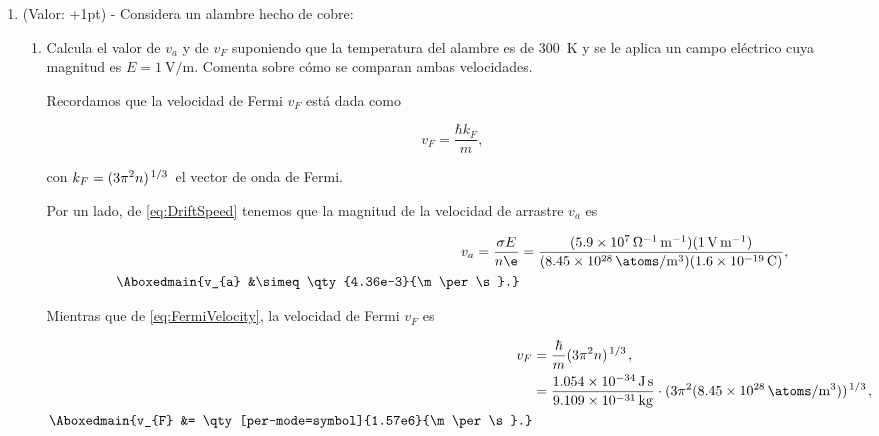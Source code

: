 \documentclass[./../main.tex]{subfiles}
\begin{document}
\begin{exercise}
\begin{enumerate}
            \color{blue}
            \item (Valor: +1pt) - Considera un alambre hecho de cobre:
                \begin{enumerate}[label = (b.\arabic*)]
                    \item Calcula el valor de \(v_{a}\) y de \(v_{F}\) suponiendo que la temperatura del alambre es de \qty{300}{\kelvin} y se le aplica un campo eléctrico cuya magnitud es \(E = \qty{1}{\V\per\m}\). Comenta sobre cómo se comparan ambas velocidades.
                    
                    \color{black}
                    \begin{solution}
                        Recordamos que la velocidad de Fermi \(v_{F}\) está dada como

                        \begin{equation}
                            v_{F} = \dfrac{\hbar k_{F}}{m},
                            \label{eq:FermiVelocity}
                        \end{equation}

                        con \(k_{F} = (3\pi^{2}n)^{\slashfrac{1}{3}}\) el vector de onda de Fermi.

                        Por un lado, de \cref{eq:DriftSpeed} tenemos que la magnitud de la velocidad de arrastre \(v_{a}\) es

                        \begin{align*}
                            v_{a} = \dfrac{\sigma E}{n\e} &= \dfrac{(\qty[per-mode=power]{5.9e7}{\per\ohm\per\m})(\qty{1}{\V\per\m})}{(\qty[per-mode=symbol]{8.45e28}{\atoms\per\m\cubed})(\qty{1.6e-19}{\C})},\\
                            \Aboxedmain{v_{a} &\simeq \qty{4.36e-3}{\m\per\s}.}
                        \end{align*}

                        Mientras que de \cref{eq:FermiVelocity}, la velocidad de Fermi \(v_{F}\) es

                        \begin{align}
                            v_{F} &= \dfrac{\hbar}{m}(3\pi^{2}n)^{\slashfrac{1}{3}},\label{eq:FermiVelocityComplete}\\
                            &= \dfrac{\qty{1.054e-34}{\J\s}}{\qty{9.109e-31}{\kg}}\cdot (3\pi^{2}(\qty[per-mode=symbol]{8.45e28}{\atoms\per\m\cubed}))^{\slashfrac{1}{3}},\nonumber\\
                            \Aboxedmain{v_{F} &= \qty[per-mode=symbol]{1.57e6}{\m\per\s}.}\label{eq:FermiVelocityForCopper}
                        \end{align}


\end{solution}
\end{enumerate}
\end{enumerate}
\end{exercise}
\end{document}
